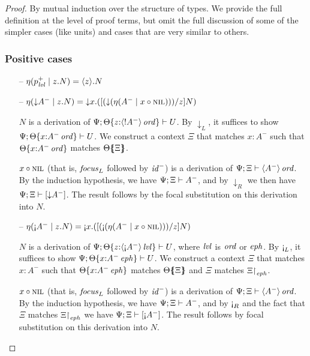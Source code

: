 \begin{proof} By mutual induction over the structure of types. We 
provide the full definition at the level of proof terms, but omit
the full discussion of some of the simpler cases (like units) and
cases that are very similar to others.

\subsubsection{Positive cases}

\begin{itemize}
\item[--] $\etapa{z}{N}{p^+_\mlvl} = \tetap{z}{N}$
\item[--] $\etapa{z}{N}{{\downarrow}A^-} 
           = \tdownl{x}{([(\tdownr{(\etana{\tfocusl{x}{\tnil}}{A^-})})/z]N)}$
  \smallskip

  $N$ is a derivation of 
  $\foc{\Psi}{\tackon{\Theta}{z{:}\istrue{\susp{{!}A^-}}}}{U}$.
  By ${\downarrow_L}$, it suffices to show 
  $\foc{\Psi}{\tackon{\Theta}{x{:}\istrue{A^-}}}{U}$.
  We construct a context $\Xi$ that matches $x{:}A^-$ such that
  $\tackon{\Theta}{x{:}\istrue{A^-}}$ matches $\frameoff{\Theta}{\Xi}$.
  \smallskip

  $\tfocusl{x}{\tnil}$ (that is, ${\it focus}_L$ followed by ${\it id}^-$) 
  is a derivation of 
  $\foc{\Psi}{\Xi}{\istrue{\susp{A^-}}}$.
  By the induction hypothesis, we have 
  $\foc{\Psi}{\Xi}{A^-}$, and by ${\downarrow}_R$
  we then have 
  $\foc{\Psi}{\Xi}{[ {\downarrow}{A^-} ]}$. 
  The result follows by the focal substitution on this derivation into $N$.
  \smallskip

\item[--] $\etapa{z}{N}{{\gnab}A^-}
           = \tgnabl{x}{([(\tgnabr{(\etana{\tfocusl{x}{\tnil}}{A^-})})/z]N)}$ 
  \smallskip

  $N$ is a derivation of 
  $\foc{\Psi}{\tackon{\Theta}{z{:}\islvl{\susp{{\gnab}A^-}}}}{U}$, where
  $\mlvl$ is $\mtrue$ or $\meph$.
  By ${\gnab}_L$, it suffices to show 
  $\foc{\Psi}{\tackon{\Theta}{x{:}\iseph{A^-}}}{U}$.
  We construct a context $\Xi$ that matches $x{:}A^-$ such that
  $\tackon{\Theta}{x{:}\iseph{A^-}}$ matches $\frameoff{\Theta}{\Xi}$
  and $\Xi$ matches $\restrictto{\Xi}{\meph}$.
  \smallskip

  $\tfocusl{x}{\tnil}$ (that is, ${\it focus}_L$ followed by
  ${\it id}^-$) is a derivation of $\foc{\Psi}{\Xi}{\istrue{\susp{A^-}}}$. 
  By the induction hypothesis, we have $\foc{\Psi}{\Xi}{A^-}$, 
  and by ${\gnab}_R$ and the fact that $\Xi$ matches $\restrictto{\Xi}{\meph}$
  we have $\foc{\Psi}{\Xi}{[{\gnab}A^-]}$. The result follows
  by focal substitution on this derivation into $N$.
  \smallskip


\end{itemize}
\end{proof}
